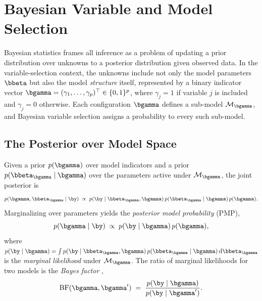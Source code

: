 \section{Bayesian Variable and Model Selection}
\label{sec:intro-bayes}

Bayesian statistics frames all inference as a problem of updating a prior
distribution over unknowns to a posterior distribution given observed data.
In the variable-selection context, the unknowns include not only the model
parameters $\bbeta$ but also the model \emph{structure} itself, represented
by a binary indicator vector
$\bgamma = (\gamma_1, \ldots, \gamma_p)^{\top} \in \{0,1\}^p$, where
$\gamma_j = 1$ if variable $j$ is included and $\gamma_j = 0$ otherwise.
Each configuration $\bgamma$ defines a sub-model $\mathcal{M}_{\bgamma}$,
and Bayesian variable selection assigns a probability to every such
sub-model.

\subsection{The Posterior over Model Space}
\label{subsec:posterior-model}

Given a prior $p(\bgamma)$ over model indicators and a prior
$p(\bbeta_{\bgamma} \mid \bgamma)$ over the parameters active under
$\mathcal{M}_{\bgamma}$, the joint posterior is
\begin{equation}
  p(\bgamma, \bbeta_{\bgamma} \mid \by)
  \;\propto\;
  p(\by \mid \bbeta_{\bgamma}, \bgamma)\,
  p(\bbeta_{\bgamma} \mid \bgamma)\,
  p(\bgamma).
  \label{eq:joint-posterior}
\end{equation}
Marginalizing over parameters yields the \emph{posterior model
probability} (PMP),
\begin{equation}
  p(\bgamma \mid \by)
  \;\propto\;
  p(\by \mid \bgamma)\, p(\bgamma),
  \label{eq:pmp}
\end{equation}
where $p(\by \mid \bgamma) = \int p(\by \mid \bbeta_{\bgamma},
\bgamma)\,p(\bbeta_{\bgamma}\mid\bgamma)\,\mathrm{d}\bbeta_{\bgamma}$
is the \emph{marginal likelihood} under $\mathcal{M}_{\bgamma}$. The ratio
of marginal likelihoods for two models is the \emph{Bayes factor}
\citep{kass1995bayes},
\begin{equation}
  \mathrm{BF}(\bgamma, \bgamma')
  \;=\;
  \frac{p(\by \mid \bgamma)}{p(\by \mid \bgamma')}.
  \label{eq:bayes-factor}
\end{equation}

